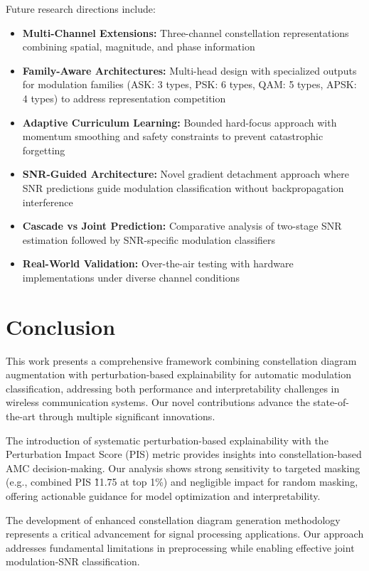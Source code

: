 \documentclass{ELSP}
\begin{document}
Future research directions include:
\begin{itemize}
    \item \textbf{Multi-Channel Extensions:} Three-channel constellation representations combining spatial, magnitude, and phase information
    \item \textbf{Family-Aware Architectures:} Multi-head design with specialized outputs for modulation families (ASK: 3 types, PSK: 6 types, QAM: 5 types, APSK: 4 types) to address representation competition
    \item \textbf{Adaptive Curriculum Learning:} Bounded hard-focus approach with momentum smoothing and safety constraints to prevent catastrophic forgetting
    \item \textbf{SNR-Guided Architecture:} Novel gradient detachment approach where SNR predictions guide modulation classification without backpropagation interference
    \item \textbf{Cascade vs Joint Prediction:} Comparative analysis of two-stage SNR estimation followed by SNR-specific modulation classifiers
    \item \textbf{Real-World Validation:} Over-the-air testing with hardware implementations under diverse channel conditions
\end{itemize}

\section{Conclusion}

This work presents a comprehensive framework combining constellation diagram augmentation with perturbation-based explainability for automatic modulation classification, addressing both performance and interpretability challenges in wireless communication systems. Our novel contributions advance the state-of-the-art through multiple significant innovations.

The introduction of systematic perturbation-based explainability with the Perturbation Impact Score (PIS) metric provides insights into constellation-based AMC decision-making. Our analysis shows strong sensitivity to targeted masking (e.g., combined PIS \~11.75 at top 1\%) and negligible impact for random masking, offering actionable guidance for model optimization and interpretability.

The development of enhanced constellation diagram generation methodology represents a critical advancement for signal processing applications. Our approach addresses fundamental limitations in preprocessing while enabling effective joint modulation-SNR classification.
\end{document}
